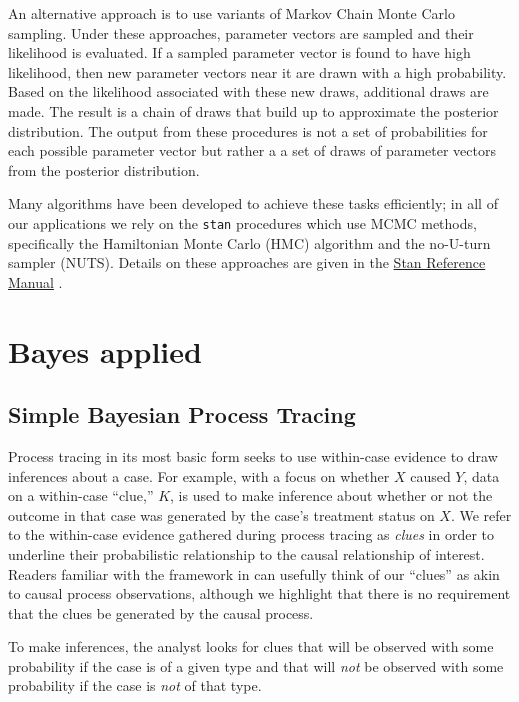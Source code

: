 \documentclass[
  12pt,
]{book}
\begin{document}
An alternative approach is to use variants of Markov Chain Monte Carlo sampling. Under these approaches, parameter vectors are sampled and their likelihood is evaluated. If a sampled parameter vector is found to have high likelihood, then new parameter vectors near it are drawn with a high probability. Based on the likelihood associated with these new draws, additional draws are made. The result is a chain of draws that build up to approximate the posterior distribution. The output from these procedures is not a set of probabilities for each possible parameter vector but rather a a set of draws of parameter vectors from the posterior distribution.

Many algorithms have been developed to achieve these tasks efficiently; in all of our applications we rely on the \texttt{stan} procedures which use MCMC methods, specifically the Hamiltonian Monte Carlo (HMC) algorithm and the no-U-turn sampler (NUTS). Details on these approaches are given in the \href{https://mc-stan.org/docs/2_18/reference-manual/hmc-chapter.html}{Stan Reference Manual} \citep{stan2020stan}.

\hypertarget{bayes-applied}{%
\section{Bayes applied}\label{bayes-applied}}

\hypertarget{simple-bayesian-process-tracing}{%
\subsection{Simple Bayesian Process Tracing}\label{simple-bayesian-process-tracing}}

Process tracing in its most basic form seeks to use within-case evidence to draw inferences about a case. For example, with a focus on whether \(X\) caused \(Y\), data on a within-case ``clue,'' \(K\), is used to make inference about whether or not the outcome in that case was generated by the case's treatment status on \(X\). We refer to the within-case evidence gathered during process tracing as \emph{clues} in order to underline their probabilistic relationship to the causal relationship of interest. Readers familiar with the framework in \citet{collier2004sources} can usefully think of our ``clues'' as akin to causal process observations, although we highlight that there is no requirement that the clues be generated by the causal process.

To make inferences, the analyst looks for clues that will be observed with some probability if the case is of a given type and that will \emph{not} be observed with some probability if the case is \emph{not} of that type.
\end{document}
